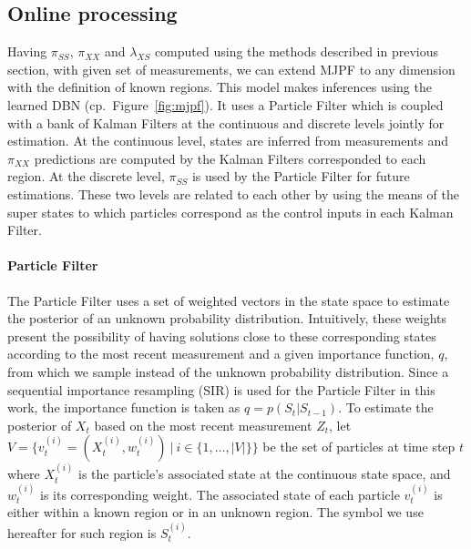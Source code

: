 \documentclass{article}
\begin{document}
\begin{multicols}{2}
\section{Online processing}\label{sec:online-processing}
    Having $\pi_{SS}$, $\pi_{XX}$ and $\lambda_{XS}$ computed using the methods described in previous section, with given set of measurements, we can extend MJPF to any dimension with the  definition of known regions. This model makes inferences using the learned DBN (cp.~Figure~\ref{fig:mjpf}). It uses a Particle Filter which is coupled with a bank of Kalman Filters at the continuous and discrete levels jointly for estimation. At the continuous level, states are inferred from measurements and  $\pi_{XX}$ predictions are computed by the Kalman Filters corresponded to each region. At the discrete level, $\pi_{SS}$ is used by the Particle Filter for future estimations. These two levels are related to each other by using the means of the super states to which particles correspond as the control inputs in each Kalman Filter.  
    
    \paragraph{Particle Filter} The Particle Filter uses a set of weighted vectors in the state space to estimate the posterior of an unknown probability distribution. Intuitively, these weights present the possibility of having solutions close to these corresponding states according to the most recent measurement and a given importance function, $q$, from which we sample instead of the unknown probability distribution. Since a sequential importance resampling (SIR) is used for the Particle Filter in this work, the importance function is taken as $q=p(S_t|S_{t-1})$. To estimate the posterior of $X_t$ based on the most recent measurement $Z_t$, let $V = \{v_{t}^{(i)}=(X_{t}^{(i)},w_{t}^{(i)}) \ | \ i \in \{1, \dots, |V|\}\}$ be the set of particles at time step $t$  where $X_{t}^{(i)}$ is the particle's associated state at the continuous state space, and $w_{t}^{(i)}$ is its corresponding weight. The associated state of each particle $v_{t}^{(i)}$ is either within a known region or in an unknown region. The symbol we use hereafter for such region is $S_{t}^{(i)}$.  
    

\end{multicols}
\end{document}

